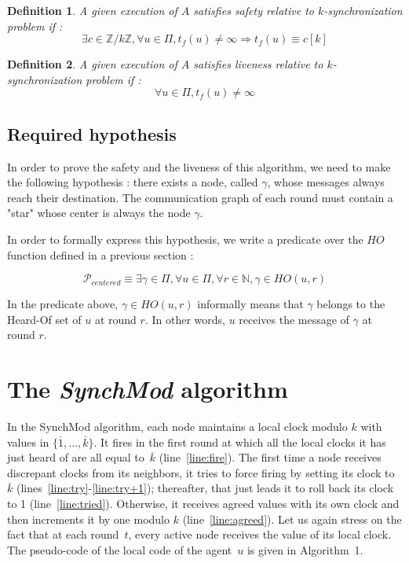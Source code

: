 \documentclass{article}
\newtheorem{definition}{Definition}
\newcommand{\cent}{\gamma}
\newcommand{\tf}{t_{f}}
\begin{document}
\begin{definition}
	A given execution of $A$ satisfies safety relative to $k$-synchronization problem if :
	$$\exists c \in \mathds{Z}/k\mathds{Z}, \forall u \in \Pi,
	\tf(u) \neq \infty \Rightarrow \tf(u) \equiv c[k]$$
\end{definition}

\begin{definition}
	A given execution of $A$ satisfies liveness relative to $k$-synchronization problem if :
	$$\forall u \in \Pi, \tf(u) \neq \infty$$
\end{definition}

\subsection{Required hypothesis}

In order to prove the safety and the liveness of this algorithm, we need to make the following hypothesis :
there exists a node, called $\cent$, whose messages always reach their destination.
The communication graph of each round must contain a "star" whose center is always the node $\cent$.

In order to formally express this hypothesis, we write a predicate over the $HO$ function defined in a previous section :

$$\mathcal{P}_{centered} \equiv \exists \cent \in \Pi, \forall u \in \Pi, \forall r \in \mathds{N}, \cent \in HO(u,r)$$

In the predicate above, $\cent \in HO(u,r)$ informally means that $\cent$ belongs to the Heard-Of set of $u$ at round $r$. In other words, $u$ receives the message of $\cent$ at round $r$.

\section{The \textit{SynchMod} algorithm}

In the SynchMod algorithm, each node  maintains a local clock modulo $k$ with values in $\{ \overline{1}, \dots,  \overline{k} \}$.
It fires in the first round at which all the local clocks it has just heard of  are all equal to~$\overline{k} $ (line~\ref{line:fire}).
The first time a node receives discrepant clocks from its neighbors, it tries to force firing  by setting its clock to  $\overline{k} $
	(lines~\ref{line:try}-\ref{line:try+1});
	thereafter, that  just leads it to roll back its clock to 1 (line~\ref{line:tried}).
Otherwise, it receives agreed values with its own clock and then increments it by one modulo $k$ (line~\ref{line:agreed}).
Let us again stress on the fact that at each round~$t$, every active node receives the value of its local clock.
The pseudo-code of the local code of the agent~$u$ is given in Algorithm~1.
\end{document}
